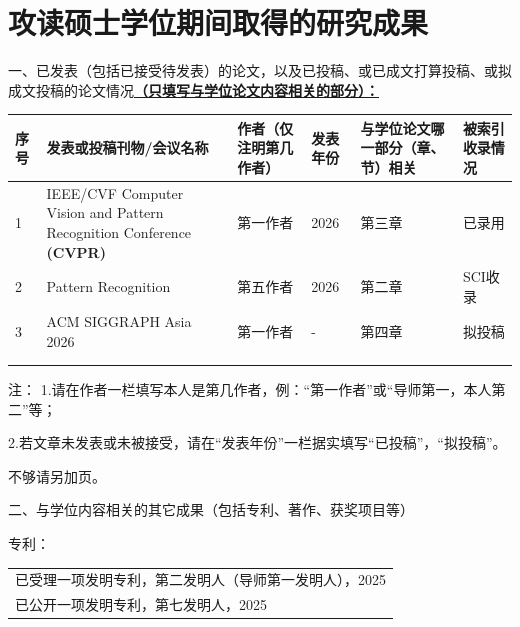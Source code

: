 
\chapter{攻读硕士学位期间取得的研究成果}

一、已发表（包括已接受待发表）的论文，以及已投稿、或已成文打算投稿、或拟成文投稿的论文情况\underline{\textbf{（只填写与学位论文内容相关的部分）：}}
\begin{table}[h]
    \centering
    \renewcommand{\arraystretch}{2}
    \renewcommand{\tabularxcolumn}[1]{m{#1}}
    \begin{tabularx}{\textwidth}{|m{0.4cm}<{\centering}|X<{\centering}|m{2.0cm}<{\centering}|m{1.5cm}<{\centering}|m{2.0cm}<{\centering}|m{1.6cm}<{\centering}|}
        \hline
        \textbf{序号} & 
        \textbf{发表或投稿刊物/会议名称} & 
        \textbf{作者（仅注明第几作者）} & 
        \textbf{发表年份} & 
        \textbf{与学位论文哪一部分（章、节）相关} & 
        \textbf{被索引收录情况} \\ 
        \hline
        
        1 & 
        IEEE/CVF Computer Vision and Pattern Recognition Conference \textbf{(CVPR)} & 
        第一作者 &
        2026 & 
        第三章 & 
        已录用 \\
        \hline
        2 & 
        Pattern Recognition & 
        第五作者 &
        2026 & 
        第二章 & 
        SCI收录 \\
        \hline
        3 &
        ACM SIGGRAPH Asia 2026 &
        第一作者 &
        - &
        第四章 &
        拟投稿 \\
        \hline
        & & & & & \\[2.5em] 
        \hline
        & & & & & \\[2.5em] 
        \hline
        
    \end{tabularx}
\end{table}

\vspace{-1em}

注： 1.请在作者一栏填写本人是第几作者，例：“第一作者”或“导师第一，本人第二”等；

\vspace{-0.6em}
\indent\indent 2.若文章未发表或未被接受，请在“发表年份”一栏据实填写“已投稿”，“拟投稿”。

\vspace{-0.6em}
\indent\indent 不够请另加页。
\vspace{0.6em}

\hspace{1em}二、与学位内容相关的其它成果（包括专利、著作、获奖项目等）

\vspace{0.5em}
\indent\indent 专利：\begin{tabular}[t]{@{}l@{}}
        已受理一项发明专利，第二发明人（导师第一发明人），2025\\
        已公开一项发明专利，第七发明人，2025
    \end{tabular}